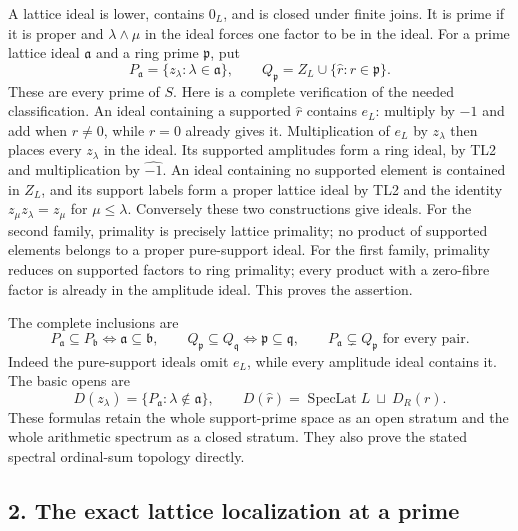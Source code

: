 \documentclass[11pt,a4paper]{article}
\theoremstyle{definition}\newtheorem{definition}[theorem]{Definition}
\begin{document}
A lattice ideal is lower, contains \(0_L\), and is closed under finite
joins. It is prime if it is proper and \(\lambda\wedge\mu\) in the ideal
forces one factor to be in the ideal. For a prime lattice ideal
\(\mathfrak a\) and a ring prime \(\mathfrak p\), put \[
 P_{\mathfrak a}=\{z_\lambda:\lambda\in\mathfrak a\},\qquad
 Q_{\mathfrak p}=Z_L\cup\{\widehat r:r\in\mathfrak p\}.
 \tag{TL3}
\] These are every prime of \(S\). Here is a complete verification of
the needed classification. An ideal containing a supported
\(\widehat r\) contains \(e_L\): multiply by \(-1\) and add when
\(r\ne0\), while \(r=0\) already gives it. Multiplication of \(e_L\) by
\(z_\lambda\) then places every \(z_\lambda\) in the ideal. Its
supported amplitudes form a ring ideal, by TL2 and multiplication by
\(\widehat{-1}\). An ideal containing no supported element is contained
in \(Z_L\), and its support labels form a proper lattice ideal by TL2
and the identity \(z_\mu z_\lambda=z_\mu\) for \(\mu\le\lambda\).
Conversely these two constructions give ideals. For the second family,
primality is precisely lattice primality; no product of supported
elements belongs to a proper pure-support ideal. For the first family,
primality reduces on supported factors to ring primality; every product
with a zero-fibre factor is already in the amplitude ideal. This proves
the assertion.

The complete inclusions are \[
 P_{\mathfrak a}\subseteq P_{\mathfrak b}\iff\mathfrak a\subseteq\mathfrak b,
 \qquad Q_{\mathfrak p}\subseteq Q_{\mathfrak q}\iff\mathfrak p\subseteq\mathfrak q,
 \qquad P_{\mathfrak a}\subsetneq Q_{\mathfrak p}\text{ for every pair}.
 \tag{TL4}
\] Indeed the pure-support ideals omit \(e_L\), while every amplitude
ideal contains it. The basic opens are \[
 D(z_\lambda)=\{P_{\mathfrak a}:\lambda\notin\mathfrak a\},\qquad
 D(\widehat r)=\operatorname{SpecLat}L\ \sqcup\ D_R(r).
 \tag{TL5}
\] These formulas retain the whole support-prime space as an open
stratum and the whole arithmetic spectrum as a closed stratum. They also
prove the stated spectral ordinal-sum topology directly.

\subsection{2. The exact lattice localization at a
prime}\label{the-exact-lattice-localization-at-a-prime}
\end{document}
